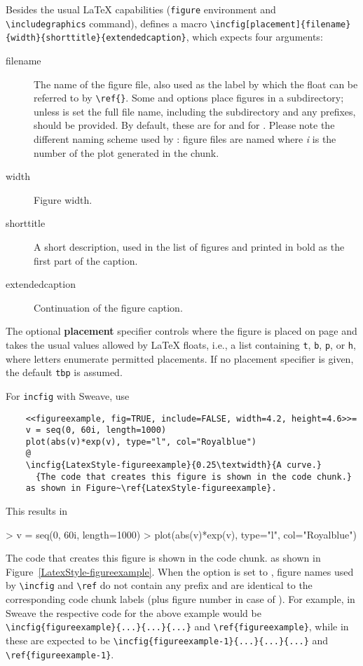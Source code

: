 \documentclass{article}
\begin{document}
Besides the usual \LaTeX{} capabilities (\verb+figure+ environment and
\verb+\includegraphics+ command),  defines a
macro \verb+\incfig[placement]{filename}{width}{shorttitle}{extendedcaption}+,
which expects four arguments:
\begin{description}%
\item[filename] The name of the figure file, also used as the label by
  which the float can be referred to by \verb+\ref{}+. Some
   and  options place figures in a
  subdirectory; unless  is set the full file name,
  including the subdirectory and any prefixes, should be provided. By default,
  these are  for  and  for
  . Please note the different naming scheme used by
  : figure files are named  where \emph{i}
  is the number of the plot generated in the chunk.
\item[width] Figure width.
\item[shorttitle] A short description, used in the list of figures and
  printed in bold as the first part of the caption.
\item[extendedcaption] Continuation of the figure caption.
\end{description}
The optional \textbf{placement} specifier controls where the figure is placed
on page and takes the usual values allowed by \LaTeX{} floats, i.e., a list
containing \verb+t+, \verb+b+, \verb+p+, or \verb+h+, where letters enumerate
permitted placements. If no placement specifier is given, the default
\verb+tbp+ is assumed.

For \verb+incfig+ with Sweave, use
\begin{verbatim}
    <<figureexample, fig=TRUE, include=FALSE, width=4.2, height=4.6>>=
    v = seq(0, 60i, length=1000)
    plot(abs(v)*exp(v), type="l", col="Royalblue")
    @
    \incfig{LatexStyle-figureexample}{0.25\textwidth}{A curve.}
      {The code that creates this figure is shown in the code chunk.}
    as shown in Figure~\ref{LatexStyle-figureexample}.
\end{verbatim}
This results in
\begin{Schunk}
\begin{Sinput}
> v = seq(0, 60i, length=1000)
> plot(abs(v)*exp(v), type="l", col="Royalblue")
\end{Sinput}
\end{Schunk}

  {The code that creates this figure is shown in the code chunk.}
as shown in Figure~\ref{LatexStyle-figureexample}.  When the option
 is set to , figure names used by
\verb+\incfig+ and \verb+\ref+ do not contain any prefix and are
identical to the corresponding code chunk labels (plus figure number in case of
). For example, in Sweave the respective code for the above
example would be \verb+\incfig{figureexample}{...}{...}{...}+ and
\verb+\ref{figureexample}+, while in  these are expected to be
\verb+\incfig{figureexample-1}{...}{...}{...}+ and
\verb+\ref{figureexample-1}+.
\end{document}

